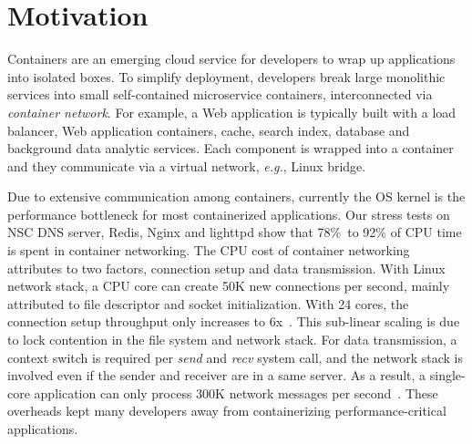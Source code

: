 \section{Motivation}
\label{sec:intro}

Containers are an emerging cloud service for developers to wrap up applications into isolated boxes. To simplify deployment, developers break large monolithic services into small self-contained microservice containers, interconnected via \textit{container network}. For example, a Web application is typically built with a load balancer, Web application containers, cache, search index, database and background data analytic services.
Each component is wrapped into a container and they communicate via a virtual network, \textit{e.g.}, Linux bridge.

Due to extensive communication among containers, currently the OS kernel is the performance bottleneck for most containerized applications.
Our stress tests on NSC DNS server, Redis, Nginx and lighttpd show that 78\%\ to 92\% of CPU time is spent in container networking.
The CPU cost of container networking attributes to two factors, connection setup and data transmission. With Linux network stack, a CPU core can create 50K new connections per second, mainly attributed to file descriptor and socket initialization.
With 24 cores, the connection setup throughput only increases to 6x~\cite{lin2016scalable}. This sub-linear scaling is due to lock contention in the file system and network stack.
For data transmission, a context switch is required per \textit{send} and \textit{recv} system call, and the network stack is involved even if the sender and receiver are in a same server.
As a result, a single-core application can only process 300K network messages per second~\cite{peter2016arrakis}.
These overheads kept many developers away from containerizing performance-critical applications.

